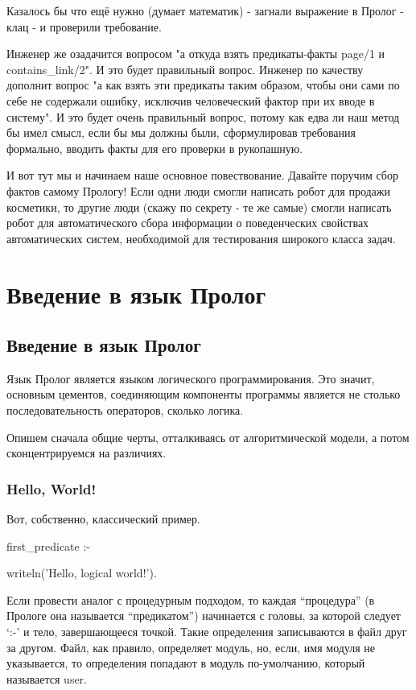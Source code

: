 \documentclass[a4paper]{book}
\begin{document}
Казалось бы что ещё нужно (думает математик) - загнали выражение
в Пролог - клац - и проверили требование.

Инженер же озадачится вопросом "а откуда взять предикаты-факты
page/1 и contains\_link/2". И это будет правильный
вопрос. Инженер по качеству дополнит вопрос "а как взять эти
предикаты таким образом, чтобы они сами по себе не содержали
ошибку, исключив человеческий фактор при их вводе в систему". И
это будет очень правильный вопрос, потому как едва ли наш метод
бы имел смысл, если бы мы должны были, сформулировав требования
формально, вводить факты для его проверки в рукопашную.

И вот тут мы и начинаем наше основное повествование.  Давайте
поручим сбор фактов самому Прологу! Если одни люди смогли
написать робот для продажи косметики, то другие люди (скажу по
секрету - те же самые) смогли написать робот для автоматического
сбора информации о поведенческих свойствах автоматических систем,
необходимой для тестирования широкого класса задач.

\part{Введение в язык Пролог}
\chapter{Введение в язык Пролог}

Язык Пролог является языком логического программирования. Это
значит, основным цементов, соединяющим компоненты программы
является не столько последовательность операторов, сколько
логика. 

Опишем сначала общие черты, отталкиваясь от алгоритмической
модели, а потом сконцентрируемся на различиях.

\section{Hello, World!}

Вот, собственно, классический пример.

\begin{example}{}{}
first_predicate :-

   writeln('Hello, logical world!').
\end{example}

Если провести аналог с процедурным подходом, то каждая
``процедура'' (в Прологе она называется ``предикатом'')
начинается с головы, за которой следует `:-' и тело,
завершающееся точкой. Такие определения записываются в файл друг
за другом. Файл, как правило, определяет модуль, но, если, имя
модуля не указывается, то определения попадают в модуль
по-умолчанию, который называется user.
\end{document}
